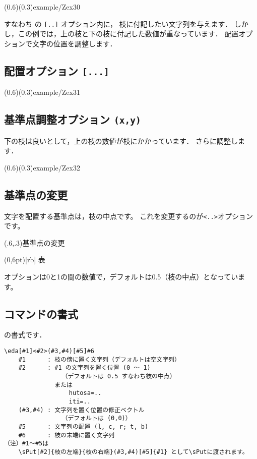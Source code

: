 \documentclass[a4j]{jarticle}
\begin{document}
\showexample[確率樹形図](0.6)(0.3){example/Zex30}

すなわち  の \texttt{[..]} オプション内に，
枝に付記したい文字列を与えます．
しかし，この例では，上の枝と下の枝に付記した数値が重なっています．
配置オプションで文字の位置を調整します．

\subsection{配置オプション \texttt{[...]}}
\showexample[文字位置調整(1)](0.6)(0.3){example/Zex31}

\subsection{基準点調整オプション \texttt{(x,y)}}
下の枝は良いとして，上の枝の数値が枝にかかっています．
さらに調整します．

\showexample[文字位置調整(2)](0.6)(0.3){example/Zex32}

\subsection{基準点の変更}
文字を配置する基準点は，枝の中点です。
これを変更するのが\verb+<..>+オプションです。

\begin{showEx}(.6,.3){基準点の変更}
\begin{zyukeizu}%
  (0,6pt)[rb]{ 表 }%
\end{zyukeizu}%
\end{showEx}

オプションは0と1の間の数値で，デフォルトは0.5（枝の中点）となっています。


\subsection{ コマンドの書式}
の書式です．
\begin{boxnote}
\begin{verbatim}
\eda[#1]<#2>(#3,#4)[#5]#6
    #1      : 枝の傍に置く文字列（デフォルトは空文字列）
    #2      : #1 の文字列を置く位置 (0 〜 1) 
                （デフォルトは 0.5 すなわち枝の中点）
              または
                  hutosa=..
                  iti=..
    (#3,#4) : 文字列を置く位置の修正ベクトル 
                （デフォルトは (0,0)）
    #5      : 文字列の配置 (l, c, r; t, b)
    #6      : 枝の末端に置く文字列
（注）#1〜#5は
    \sPut[#2]{枝の左端}{枝の右端}(#3,#4)[#5]{#1} として\sPutに渡されます。
\end{verbatim}
\end{boxnote}
\end{document}
